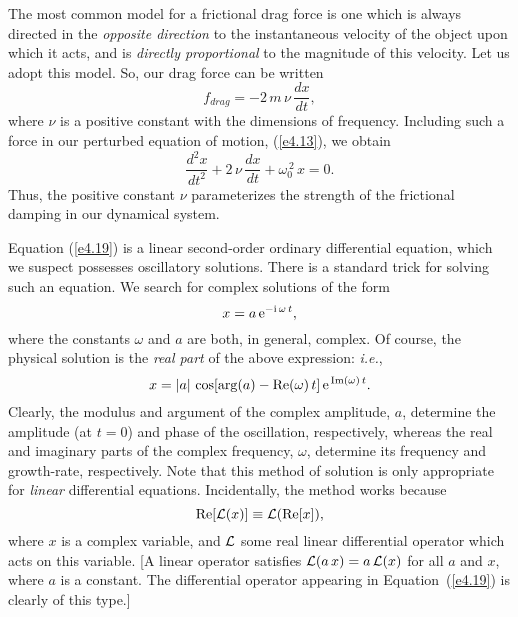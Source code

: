 The most common model for a frictional drag force is  one which is
always directed in the {\em opposite direction}\/ to the instantaneous velocity
of the object upon which it acts, and is {\em directly proportional}\/ to the magnitude
of this velocity. Let us adopt this model.
So, our drag force can be written
\begin{equation}
f_{drag} = - 2\,m\,\nu\,\frac{dx}{dt},
\end{equation}
where $\nu$ is a positive constant with the dimensions of frequency. Including such a force in our
perturbed equation of motion, (\ref{e4.13}),  we obtain
\begin{equation}\label{e4.19}
\frac{d^2 x}{dt^2} + 2\,\nu\,\frac{dx}{dt} + \omega_0^{\,2}\,x
= 0.
\end{equation}
Thus, the positive constant $\nu$ parameterizes the strength of the frictional
damping  in our dynamical system.

Equation (\ref{e4.19}) is a linear second-order ordinary differential
equation, which we suspect possesses oscillatory solutions. There is
a standard trick for solving such an equation. We search for complex
 solutions of the form
\begin{equation}\label{e4.20}
x = a\,{\rm e}^{-{\rm i}\,\omega\,t},
\end{equation}
where the constants $\omega$ and $a$ are both, in general, complex. Of course,
the physical solution is the {\em real part}\/ of the above expression: {\em i.e.}, 
\begin{equation}
x = |a|\,\cos[{\rm arg}(a)-{\rm Re}(\omega)\,t]\,{\rm e}^{\,{\rm Im}(\omega)\,t}.
\end{equation}
Clearly, the modulus and argument of the complex amplitude, $a$, determine
the amplitude (at $t=0$) and phase of the oscillation, respectively, whereas the
real and imaginary parts of the complex frequency, $\omega$, determine its
 frequency and growth-rate, respectively.
Note that this method of solution is only appropriate for {\em linear}\/ differential
equations. Incidentally, the method works because
\begin{equation}
{\rm Re}[{\cal L}(x)]\equiv {\cal L}({\rm Re}[x]),
\end{equation}
where $x$ is a complex variable, and ${\cal L}$ some real linear differential
operator which acts on this variable. [A linear operator satisfies  ${\cal L}(a\,x)=a\,{\cal L}(x)$ for all $a$ and $x$, where $a$ is a constant. The differential operator appearing
in Equation~(\ref{e4.19}) is clearly of this type.]

